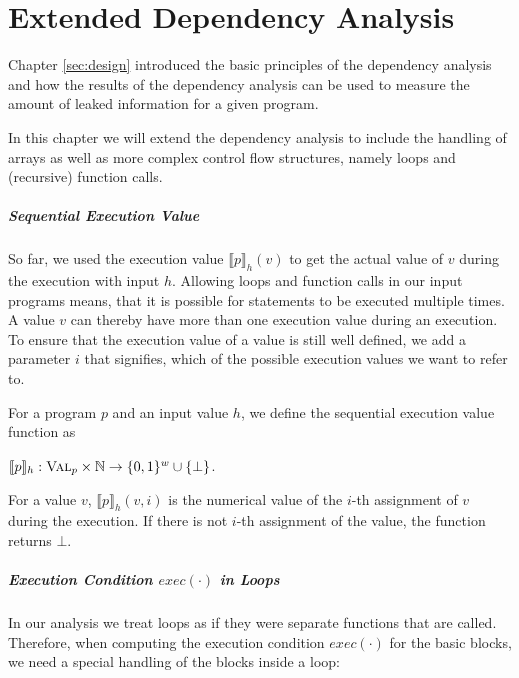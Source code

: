 \chapter{Extended Dependency Analysis}\label{ch:loops}

Chapter \ref{sec:design} introduced the basic principles of the dependency analysis and how the results of the dependency analysis can be used to measure the amount of leaked information for a given program.

In this chapter we will extend the dependency analysis to include the handling of arrays as well as more complex control flow structures, namely loops and (recursive) function calls.

\paragraph{Sequential Execution Value}
So far, we used the execution value $\llbracket p \rrbracket_h (v)$ to get the actual value of $v$ during the execution with input $h$. Allowing loops and function calls in our input programs means, that it is possible for statements to be executed multiple times. A value $v$ can thereby have more than one execution value during an execution.
To ensure that the execution value of a value is still well defined, we add a parameter $i$ that signifies, which of the possible execution values we want to refer to.

\begin{definition}
    For a program $p$ and an input value $h$, we define the sequential execution value function as
    \begin{center}
        $\llbracket p \rrbracket_h: \textsc{Val}_p \times \mathbb{N} \to \{0, 1\} ^w \cup \{\bot\}$.
    \end{center}
    For a value $v$, $\llbracket p \rrbracket_h(v, i)$ is the numerical value of the $i$-th assignment of $v$ during the execution. If there is not $i$-th assignment of the value, the function returns $\bot$.
\end{definition}

\paragraph{Execution Condition $exec(\cdot)$ in Loops}
In our analysis we treat loops as if they were separate functions that are called. Therefore, when computing the execution condition $exec(\cdot)$ for the basic blocks, we need a special handling of the blocks inside a loop:

